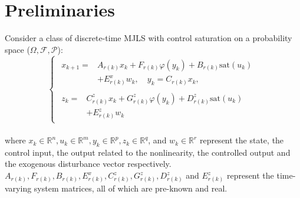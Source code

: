 \documentclass[conference]{IEEEtran}
\begin{document}




\section{Preliminaries}
Consider a class of discrete-time MJLS with control saturation on a probability space ($\varOmega,\mathcal{F},\mathcal{P}$):
\begin{equation}\label{syseq}
	\left\{
	\begin{array}{lr}
		\begin{split}
			x_{k+1}=&A_{r(k)}x_k+F_{r(k)}\varphi(y_k)+B_{r(k)}\mathrm{sat}(u_k) \\
			&+E^x_{r(k)}w_k, \quad y_k=C_{r(k)}x_k,
		\end{split}
		\\
		\begin{split}
			z_k=&C^z_{r(k)}x_k+G^z_{r(k)}\varphi(y_k)+D^z_{r(k)}\mathrm{sat}(u_k)\\
				&+E^z_{r(k)}w_k
		\end{split}
		
	\end{array}
	\right.
\end{equation}\\
where $x_k\in\mathbb{R}^{n}, u_k\in\mathbb{R}^{m}, y_k\in\mathbb{R}^{p}, z_k\in\mathbb{R}^{q}$, and $w_k\in\mathbb{R}^{r}$ represent the state, the control input, the output related to the nonlinearity, the controlled output and the exogenous disturbance vector respectively. $A_{r(k)}, F_{r(k)}, B_{r(k)}, E^x_{r(k)}, C^z_{r(k)}, G^z_{r(k)}, D^z_{r(k)}$ and $E^z_{r(k)}$ represent the time-varying system matrices, all of which are pre-known and real.  
\end{document}
